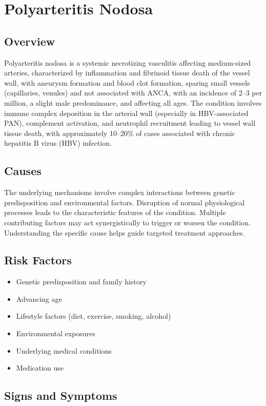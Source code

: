 \chapter{Polyarteritis Nodosa}
\label{sec:Polyarteritis Nodosa}

\section{Overview}
Polyarteritis nodosa is a systemic necrotizing vasculitis affecting medium-sized arteries, characterized by inflammation and fibrinoid tissue death of the vessel wall, with aneurysm formation and blood clot formation, sparing small vessels (capillaries, venules) and not associated with ANCA, with an incidence of 2--3 per million, a slight male predominance, and affecting all ages. The condition involves immune complex deposition in the arterial wall (especially in HBV-associated PAN), complement activation, and neutrophil recruitment leading to vessel wall tissue death, with approximately 10--20\% of cases associated with chronic hepatitis B virus (HBV) infection.
\section{Causes}
The underlying mechanisms involve complex interactions between genetic predisposition and environmental factors. Disruption of normal physiological processes leads to the characteristic features of the condition. Multiple contributing factors may act synergistically to trigger or worsen the condition. Understanding the specific cause helps guide targeted treatment approaches.
\section{Risk Factors}


\begin{itemize}[noitemsep]
  \item Genetic predisposition and family history
  \item Advancing age
  \item Lifestyle factors (diet, exercise, smoking, alcohol)
  \item Environmental exposures
  \item Underlying medical conditions
  \item Medication use
\end{itemize}
\section{Signs and Symptoms}

